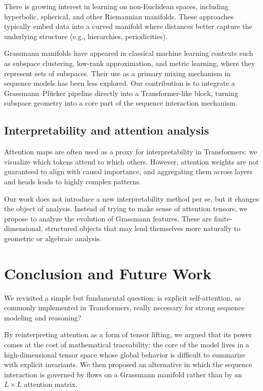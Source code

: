 \documentclass[11pt]{article}
\begin{document}
There is growing interest in learning on non-Euclidean spaces, including hyperbolic, spherical, and other Riemannian manifolds. These approaches typically embed data into a curved manifold where distances better capture the underlying structure (e.g., hierarchies, periodicities).

Grassmann manifolds have appeared in classical machine learning contexts such as subspace clustering, low-rank approximation, and metric learning, where they represent sets of subspaces. Their use as a primary mixing mechanism in sequence models has been less explored. Our contribution is to integrate a Grassmann--Pl\"ucker pipeline directly into a Transformer-like block, turning subspace geometry into a core part of the sequence interaction mechanism.

\subsection{Interpretability and attention analysis}

Attention maps are often used as a proxy for interpretability in Transformers: we visualize which tokens attend to which others. However, attention weights are not guaranteed to align with causal importance, and aggregating them across layers and heads leads to highly complex patterns.

Our work does not introduce a new interpretability method per se, but it changes the object of analysis. Instead of trying to make sense of attention tensors, we propose to analyze the evolution of Grassmann features. These are finite-dimensional, structured objects that may lend themselves more naturally to geometric or algebraic analysis.

\section{Conclusion and Future Work}

We revisited a simple but fundamental question: is explicit self-attention, as commonly implemented in Transformers, really necessary for strong sequence modeling and reasoning?

By reinterpreting attention as a form of tensor lifting, we argued that its power comes at the cost of mathematical traceability: the core of the model lives in a high-dimensional tensor space whose global behavior is difficult to summarize with explicit invariants. We then proposed an alternative in which the sequence interaction is governed by flows on a Grassmann manifold rather than by an $L\times L$ attention matrix.
\end{document}
